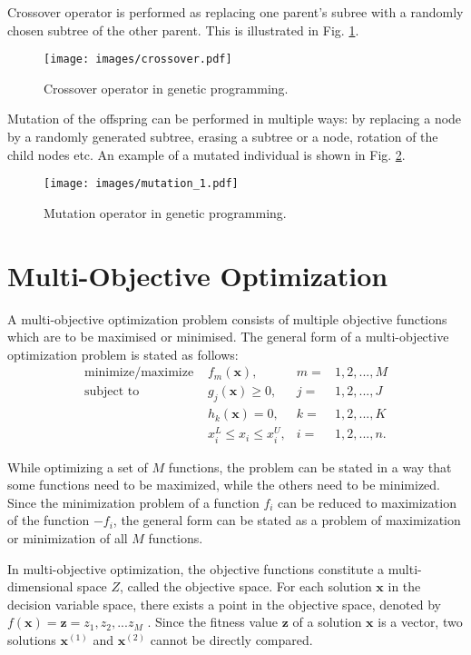 Crossover operator is performed as replacing one parent's subree with a randomly chosen subtree of the other parent.
This is illustrated in Fig. \ref{genprog:ex2}.
\begin{figure}[ht]
    \centering
    \texttt{[image: images/crossover.pdf]}
    \caption{Crossover operator in genetic programming.}
    \label{genprog:ex2}
\end{figure}

Mutation of the offspring can be performed in multiple ways: by replacing a node by a randomly generated subtree, erasing a subtree or a node, rotation of the child nodes etc.
An example of a mutated individual is shown in Fig. \ref{genprog:ex3}.
\begin{figure}[H]
    \centering
    \texttt{[image: images/mutation\_1.pdf]}
    \caption{Mutation operator in genetic programming.}
    \label{genprog:ex3}
\end{figure}

\newpage
\section{Multi-Objective Optimization}
A multi-objective optimization problem consists of multiple objective functions which are to be maximised or minimised. 
The general form of a multi-objective optimization problem is stated as follows:
\begin{align*}
\text{minimize/maximize } & f_m(\textbf{x}),  & m = & 1, 2, ..., M \\
\text{subject to } & g_j(\textbf{x}) \geq 0, & j = & 1, 2, ..., J \\
           & h_k(\textbf{x}) = 0, & k = & 1, 2, ..., K \\
           & x_{i}^{L} \leq x_i \leq x_{i}^{U}, & i = & 1, 2, ..., n. 
\end{align*}

While optimizing a set of $M$ functions, the problem can be stated in a way that some functions need to be maximized, while the others need to be minimized. 
Since the minimization problem of a function $f_i$ can be reduced to maximization of the function $-f_i$, the general form can be stated as a problem of maximization or minimization of all $M$ functions.

In multi-objective optimization, the objective functions constitute a multi-dimensional space $Z$, called the objective space. 
For each solution $\textbf{x}$ in the decision variable space, there exists a point in the objective space, denoted by $f(\textbf{x}) = \textbf{z} = {z_1, z_2, ... z_M}$ 
\cite{deb2001multi}. 
Since the fitness value $\textbf{z}$ of a solution $\textbf{x}$ is a vector, two solutions 
$\textbf{x}^{(1)}$ and $\textbf{x}^{(2)}$ cannot be directly compared. 

